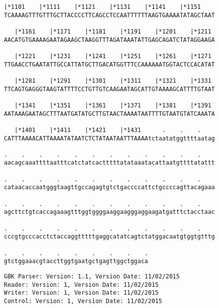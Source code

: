 \documentclass{article}
\begin{document}
\begin{Verbatim}[fontfamily=courier]
   |*1101    |*1111    |*1121    |*1131    |*1141    |*1151 
TCAAAAGTTTGTTTGCTTACCCCTTCAGCCTCCAATTTTTTAAGTGAAAATATAGCTAAT

   |*1161    |*1171    |*1181    |*1191    |*1201    |*1211 
AACATGTGAAAAGAATAGAAGCTAAGGTTTAGATAAATATTGAGCAGATCTATAGGAAGA

   |*1221    |*1231    |*1241    |*1251    |*1261    |*1271 
TTGAACCTGAATATTGCCATTATGCTTGACATGGTTTCCAAAAAATGGTACTCCACATAT

   |*1281    |*1291    |*1301    |*1311    |*1321    |*1331 
TTCAGTGAGGGTAAGTATTTTCCTGTTGTCAAGAATAGCATTGTAAAAGCATTTTGTAAT

   |*1341    |*1351    |*1361    |*1371    |*1381    |*1391 
AATAAAGAATAGCTTTAATGATATGCTTGTAACTAAAATAATTTTGTAATGTATCAAATA

   |*1401    |*1411    |*1421    |*1431      .    .    .    
CATTTAAAACATTAAAATATAATCTCTATAATAATTTAAAAtctaatatggttttaatag

.    .    .    .    .    .    .    .    .    .    .    .    
aacagcaaattttaatttcatctatcactttttatataaatacattaatgttttatattt

.    .    .    .    .    .    .    .    .    .    .    .    
cataacaccaatgggtaagttgccagagtgtctgaccccattctgccccagttacagaaa

.    .    .    .    .    .    .    .    .    .    .    .    
agcttctgtcaccagaaagtttggtggggaaggaagggaggaagatgatttctacctaac

.    .    .    .    .    .    .    .    .    .    .    .    
cccgtgcccacctctaccaggtttttgaggcatatcagtctatggacaatgtggtgtttg

.    .    .    .    .    .    .    .    .
gtctggaaacgtaccttggtgaatgctgagttggctggaca
\end{Verbatim}
\newpage
\begin{Verbatim}[fontfamily=courier]
GBK Parser: Version: 1.1, Version Date: 11/02/2015
Reader: Version: 1, Version Date: 11/02/2015
Writer: Version: 1, Version Date: 11/02/2015
Control: Version: 1, Version Date: 11/02/2015
\end{Verbatim}
\end{document}
